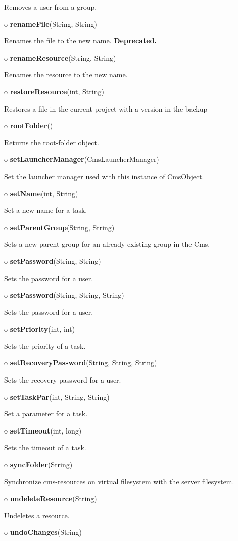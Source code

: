 \begin{description}
Removes a user from a group.
\item o {\bf renameFile}(String, String)

Renames the file to the new name. {\bf Deprecated.}
\item o {\bf renameResource}(String, String)

Renames the resource to the new name.
\item o {\bf restoreResource}(int, String)

Restores a file in the current project with a version in the backup
\item o {\bf rootFolder}()

Returns the root-folder object.
\item o {\bf setLauncherManager}(CmsLauncherManager)

Set the launcher manager used with this instance of CmsObject.
\item o {\bf setName}(int, String)

Set a new name for a task.
\item o {\bf setParentGroup}(String, String)

Sets a new parent-group for an already existing group in the Cms.
\item o {\bf setPassword}(String, String)

Sets the password for a user.
\item o {\bf setPassword}(String, String, String)

Sets the password for a user.
\item o {\bf setPriority}(int, int)

Sets the priority of a task.
\item o {\bf setRecoveryPassword}(String, String, String)

Sets the recovery password for a user.
\item o {\bf setTaskPar}(int, String, String)

Set a parameter for a task.
\item o {\bf setTimeout}(int, long)

Sets the timeout of a task.
\item o {\bf syncFolder}(String)

Synchronize cms-resources on virtual filesystem with the server filesystem.
\item o {\bf undeleteResource}(String)

Undeletes a resource.
\item o {\bf undoChanges}(String)


\end{description}
